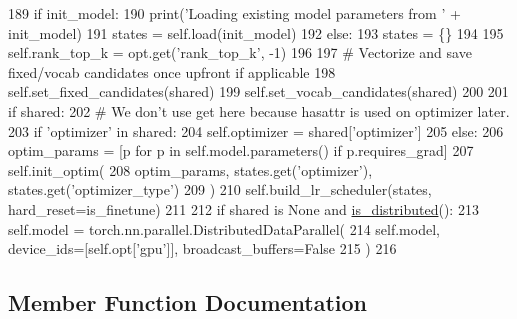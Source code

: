 \begin{DoxyCode}
189             \textcolor{keywordflow}{if} init\_model:
190                 print(\textcolor{stringliteral}{'Loading existing model parameters from '} + init\_model)
191                 states = self.load(init\_model)
192             \textcolor{keywordflow}{else}:
193                 states = \{\}
194 
195         self.rank\_top\_k = opt.get(\textcolor{stringliteral}{'rank\_top\_k'}, -1)
196 
197         \textcolor{comment}{# Vectorize and save fixed/vocab candidates once upfront if applicable}
198         self.set\_fixed\_candidates(shared)
199         self.set\_vocab\_candidates(shared)
200 
201         \textcolor{keywordflow}{if} shared:
202             \textcolor{comment}{# We don't use get here because hasattr is used on optimizer later.}
203             \textcolor{keywordflow}{if} \textcolor{stringliteral}{'optimizer'} \textcolor{keywordflow}{in} shared:
204                 self.optimizer = shared[\textcolor{stringliteral}{'optimizer'}]
205         \textcolor{keywordflow}{else}:
206             optim\_params = [p \textcolor{keywordflow}{for} p \textcolor{keywordflow}{in} self.model.parameters() \textcolor{keywordflow}{if} p.requires\_grad]
207             self.init\_optim(
208                 optim\_params, states.get(\textcolor{stringliteral}{'optimizer'}), states.get(\textcolor{stringliteral}{'optimizer\_type'})
209             )
210             self.build\_lr\_scheduler(states, hard\_reset=is\_finetune)
211 
212         \textcolor{keywordflow}{if} shared \textcolor{keywordflow}{is} \textcolor{keywordtype}{None} \textcolor{keywordflow}{and} \hyperlink{namespaceparlai_1_1utils_1_1distributed_a023acb5e3b66e1f27e21247c35661279}{is\_distributed}():
213             self.model = torch.nn.parallel.DistributedDataParallel(
214                 self.model, device\_ids=[self.opt[\textcolor{stringliteral}{'gpu'}]], broadcast\_buffers=\textcolor{keyword}{False}
215             )
216 
\end{DoxyCode}


\subsection{Member Function Documentation}
\mbox{\label{classparlai_1_1core_1_1torch__ranker__agent_1_1TorchRankerAgent_a8b16043428bbb29ee4a3ed28c2bbb472}} 
